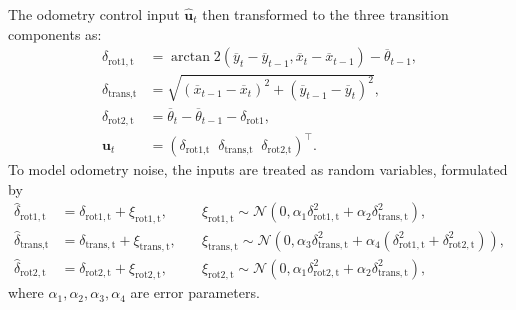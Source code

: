 The odometry control input $\hat{\mathbf{u}}_t$
then transformed to the three transition components as:
\begin{align}
    \delta_{\mathrm{rot1,t}} & =\arctan\!2\left(\overline{y}_{t}-\overline{y}_{t-1}, \overline{x}_{t}-\overline{x}_{t-1}\right)-\overline{\theta}_{t-1}, \\
    \delta_{\text {trans,t}} & =\sqrt{\left(\overline{x}_{t-1}-\overline{x}_{t}\right)^{2}+\left(\overline{y}_{t-1}-\overline{y}_{t}\right)^{2}},        \\
    \delta_{\mathrm{rot2,t}} & =\overline{\theta}_{t}-\overline{\theta}_{t-1}-\delta_{\mathrm{rot} 1},                                                   \\
    \mathbf{u}_t             & = (\delta_{\text{rot1,t}}\;\;\delta_{\text{trans,t}}\;\;\delta_{\text{rot2,t}})^{\top}.
\end{align}
To model odometry noise, the inputs are treated as random variables, formulated by
\begin{align}
    \hat{\delta}_{\mathrm{rot1,t}} & = \delta_{\mathrm{rot1,t}} + \xi_{\mathrm{rot1,t}},
    \quad                          & \xi_{\mathrm{rot1,t}} \sim \mathcal{N}(0,\alpha_1\delta_{\mathrm{rot1,t}}^2+\alpha_2\delta_{\mathrm{trans,t}}^2), \label{eq:odom-control-1}                               \\
    \hat{\delta}_{\text {trans,t}} & = \delta_{\mathrm{trans,t}} + \xi_{\mathrm{trans,t}},
    \quad                          & \xi_{\mathrm{trans,t}} \sim \mathcal{N}(0,\alpha_3\delta_{\mathrm{trans,t}}^2+\alpha_4(\delta_{\mathrm{rot1,t}}^2+\delta_{\mathrm{rot2,t}}^2)), \label{eq:odom-control-2} \\
    \hat{\delta}_{\mathrm{rot2,t}} & = \delta_{\mathrm{rot2,t}} + \xi_{\mathrm{rot2,t}},
    \quad                          & \xi_{\mathrm{rot2,t}} \sim \mathcal{N}(0,\alpha_1\delta_{\mathrm{rot2,t}}^2+\alpha_2\delta_{\mathrm{trans,t}}^2), \label{eq:odom-control-3}
\end{align}
where $\alpha_1,\alpha_2,\alpha_3,\alpha_4$ are error parameters.

